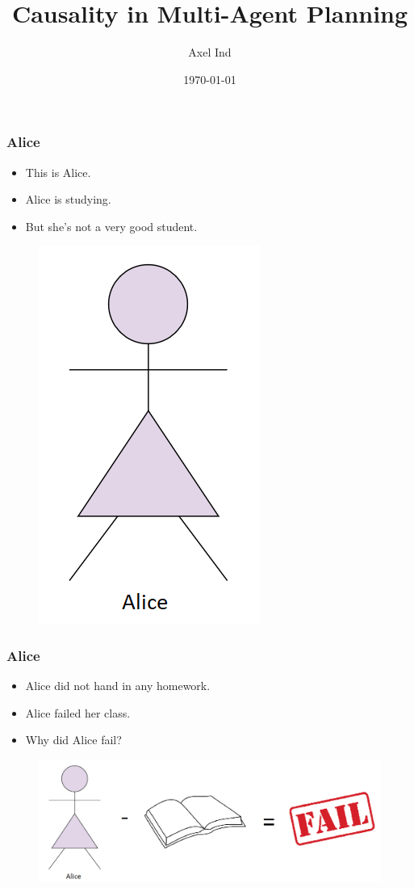 \documentclass{beamer}
\title{Causality in Multi-Agent Planning}
\author{Axel Ind}
\institute{ALU-Freiburg}
\date{\today}
\theoremstyle{plain}
\theoremstyle{definition}
\begin{document}
 
\frame{\titlepage}

\begin{frame}
\frametitle{Alice}
\begin{itemize}
\item This is Alice.
\item Alice is studying.
\item But she's not a very good student.
\end{itemize}

\begin{figure}
\includegraphics[scale=0.5]{alice}
\end{figure}

\end{frame}



\begin{frame}
\frametitle{Alice}
\begin{itemize}
\item Alice did not hand in any homework.
\item Alice failed her class.
\item Why did Alice fail?
\end{itemize}

\begin{figure}
\includegraphics[scale=0.3]{aliceFail}
\end{figure}

\end{frame}
\end{document}
